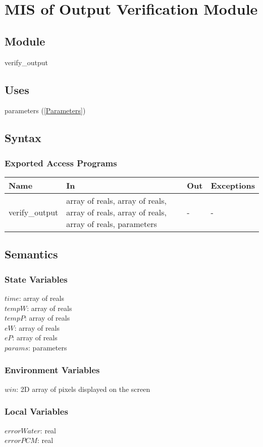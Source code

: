 \documentclass[12pt]{article}
\begin{document}
\section{MIS of Output Verification Module} \label{VerifyOutput}
\subsection{Module}
verify\_output
\subsection{Uses}
parameters (\ref{Parameters})
\subsection{Syntax}
\subsubsection{Exported Access Programs}
\begin{center}
\begin{tabular}{p{3cm} p{7cm} p{2cm} p{2cm}}
\hline
\textbf{Name} & \textbf{In} & \textbf{Out} & \textbf{Exceptions} \\
\hline
verify\_output & array of reals, array of reals, array of reals, array of reals, array of reals, parameters & - & - \\
\hline
\end{tabular}
\end{center}
\subsection{Semantics}
\subsubsection{State Variables}
$time$: array of reals \\
$tempW$: array of reals \\
$tempP$: array of reals \\
$eW$: array of reals \\
$eP$: array of reals \\
$params$: parameters
\subsubsection{Environment Variables}
$win$: 2D array of pixels displayed on the screen
\subsubsection{Local Variables}
$errorWater$: real \\
$errorPCM$: real
\end{document}
